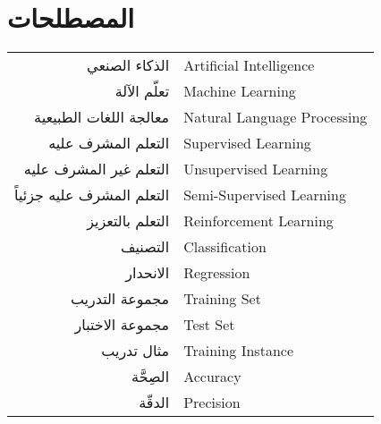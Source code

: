 


\chapter*{\flushleft المصطلحات}

\begin{doublespacing}
	\begin{center}
		\begin{longtable}{r l}
			\indent
			
			الذكاء الصنعي 			&		 	\textenglish{Artificial Intelligence}			\\
			
			
			تعلّم الآلة	 			& 			\textenglish{Machine Learning}			\\
			
			
			معالجة اللغات الطبيعية		& 			\textenglish{Natural Language Processing}	\\
			
			
			التعلم المشرف عليه		& 			\textenglish{Supervised Learning}	\\
			
			
			التعلم غير المشرف عليه		& 			\textenglish{Unsupervised Learning}	\\
			
			
			التعلم المشرف عليه جزئياً		& 			\textenglish{Semi-Supervised Learning}	\\
			
			
			التعلم بالتعزيز		& 			\textenglish{Reinforcement Learning}	\\
			
			
			التصنيف		& 			\textenglish{Classification}	\\
			
			الانحدار		& 			\textenglish{Regression}	\\
			
			مجموعة التدريب		& 			\textenglish{Training Set}	\\
			
			مجموعة الاختبار		& 			\textenglish{Test Set}	\\
			
			
			مثال تدريب		& 			\textenglish{Training Instance}	\\
			
			
			الصِحَّة			& 			\textenglish{Accuracy}				\\
			
			الدقّة			& 			\textenglish{Precision}				\\
			

\end{longtable}
\end{center}
\end{doublespacing}
